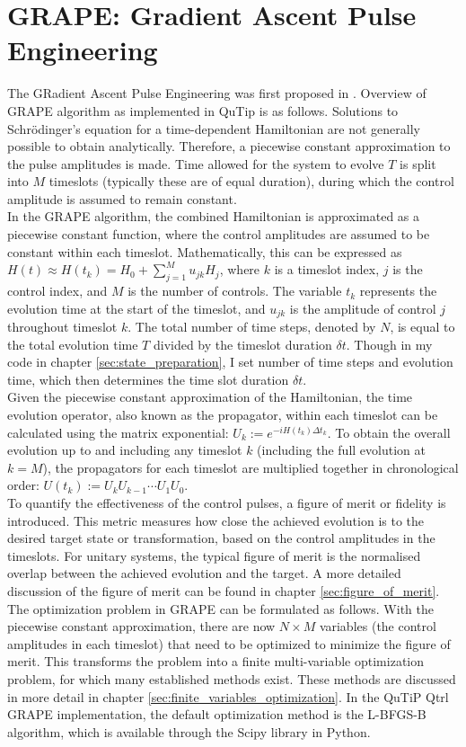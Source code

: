 \documentclass[12pt]{report}
\begin{document}
\section{GRAPE: Gradient Ascent Pulse Engineering}
The GRadient Ascent Pulse Engineering was first proposed in \cite{KHANEJA2005296}. 
Overview of GRAPE algorithm as implemented in QuTip is as follows. 
Solutions to Schrödinger's equation for a time-dependent Hamiltonian are not generally possible to obtain analytically. 
Therefore, a piecewise constant approximation to the pulse amplitudes is made. Time allowed for the system to evolve $T$ is split into $M$ timeslots (typically these are of equal duration), during which the control amplitude is assumed to remain constant. 
\\
In the GRAPE algorithm, the combined Hamiltonian is approximated as a piecewise constant function, where the control amplitudes are assumed to be constant within each timeslot. 
Mathematically, this can be expressed as $H(t) \approx H\left(t_k\right)=H_0+\sum_{j=1}^M u_{j k} H_j$, where $k$ is a timeslot index, $j$ is the control index, and $M$ is the number of controls. 
The variable $t_k$ represents the evolution time at the start of the timeslot, and $u_{jk}$ is the amplitude of control $j$ throughout timeslot $k$. 
The total number of time steps, denoted by $N$, is equal to the total evolution time $T$ divided by the timeslot duration $\delta t$.
Though in my code in chapter \ref{sec:state_preparation}, I set number of time steps and evolution time, which then determines the time slot duration $\delta t$.
\\
Given the piecewise constant approximation of the Hamiltonian, the time evolution operator, also known as the propagator, within each timeslot can be calculated using the matrix exponential: $U_k:=e^{-i H\left(t_k\right) \Delta t_k}$. 
To obtain the overall evolution up to and including any timeslot $k$ (including the full evolution at $k=M$), the propagators for each timeslot are multiplied together in chronological order: $U\left(t_k\right):=U_k U_{k-1} \cdots U_1 U_0$.
\\
To quantify the effectiveness of the control pulses, a figure of merit or fidelity is introduced. 
This metric measures how close the achieved evolution is to the desired target state or transformation, based on the control amplitudes in the timeslots. 
For unitary systems, the typical figure of merit is the normalised overlap between the achieved evolution and the target. 
A more detailed discussion of the figure of merit can be found in chapter \ref{sec:figure_of_merit}.
\\
The optimization problem in GRAPE can be formulated as follows. 
With the piecewise constant approximation, there are now $N\times M$ variables (the control amplitudes in each timeslot) that need to be optimized to minimize the figure of merit. 
This transforms the problem into a finite multi-variable optimization problem, for which many established methods exist. 
These methods are discussed in more detail in chapter \ref{sec:finite_variables_optimization}. In the QuTiP Qtrl GRAPE implementation, the default optimization method is the L-BFGS-B algorithm, which is available through the Scipy library in Python.
\end{document}

